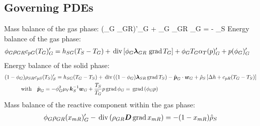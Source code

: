 \subsection{Governing PDEs}
Mass balance of the gas phase:
\beq
	(\phi_G \rho_{GR})'_G + \phi_G  \rho_{GR} \mdiv {}_G = - \hat{\rho}_S \label{eq:mass_bal}
\eeq
Energy balance of the gas phase:
\begin{align}
	&\phi_G \rho_{GR} c_{pG} (T_G)'_G = h_{SG} (T_S - T_G) +\,\mathrm{div}\,[\phi_G\mbox{${\mbox{\boldmath${\lambda}$\unboldmath}}$}_{GR}\, \,\mathrm{grad}\, T_G] + \phi_G T_G \alpha_T (p)'_G + p (\phi_G)'_G \label{eq:gas_en_bal}
\end{align}
Energy balance of the solid phase:
\begin{align}
	&(1-\phi_G) \rho_{SR} c_{pS} (T_S)'_S = h_{SG} (T_G - T_S) + \,\mathrm{div}\, ((1-\phi_G) \boldsymbol{\lambda}_{SR} \,\mathrm{grad}\, T_S) - \hat{\mbox{${\mbox{\boldmath${p}$\unboldmath}}$}}_G \cdot \mbox{${\mbox{\boldmath${w}$\unboldmath}}$}_G + \hat{\rho}_S \left[ \Delta h + c_{pR} (T_G - T_S) \right] \label{eq:solid_en_bal}\\
	&\qquad \quad \mathrm{with} \quad \hat{\mbox{${\mbox{\boldmath${p}$\unboldmath}}$}}_G = - \phi_G^2 \mu_V \mbox{${\mbox{\boldmath${k}$\unboldmath}}$}_S^{-1} \mbox{${\mbox{\boldmath${w}$\unboldmath}}$}_G + \frac{T_S}{T_G} p \,\mathrm{grad}\, \phi_G = \,\mathrm{grad}\,(\phi_G p)\nonumber
\end{align}
Mass balance of the reactive component within the gas phase:
\begin{align}
	&\phi_G \rho_{GR} (x_{mR})'_G - \,\mathrm{div}\,(\rho_{GR} \mbox{${\mbox{\boldmath${D}$\unboldmath}}$} \,\mathrm{grad}\, x_{mR}) = -(1 - x_{mR}) \hat{\rho}_S \label{eq:comp_mass_bal}\\
\end{align}

